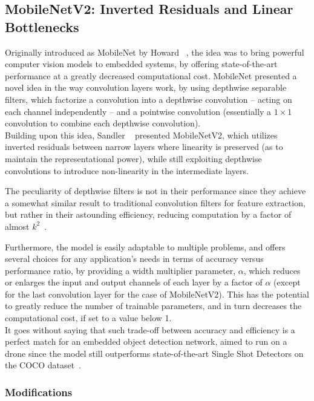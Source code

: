 \subsection{MobileNetV2: Inverted Residuals and Linear Bottlenecks}

Originally introduced as MobileNet by Howard \etal~\cite{MobileNet}, the idea
was to bring powerful computer vision models to embedded systems, by offering
state-of-the-art performance at a greatly decreased computational cost.
MobileNet presented a novel idea in the way convolution layers work, by using
depthwise separable filters, which factorize a convolution into a depthwise
convolution -- acting on each channel independently -- and a pointwise
convolution (essentially a $1\times1$ convolution to combine each depthwise
convolution).\\

Building upon this idea, Sandler \etal~\cite{MobileNetV2} presented
MobileNetV2, which utilizes inverted residuals between narrow layers where
linearity is preserved (as to maintain the representational power), while still
exploiting depthwise convolutions to introduce non-linearity in the
intermediate layers.

The peculiarity of depthwise filters is not in their performance since they
achieve a somewhat similar result to traditional convolution filters for
feature extraction, but rather in their astounding efficiency, reducing
computation by a factor of almost $k^2$~\cite{MobileNetV2}.

Furthermore, the model is easily adaptable to multiple problems, and offers
several choices for any application's needs in terms of accuracy versus
performance ratio, by providing a width multiplier parameter, $\alpha$, which
reduces or enlarges the input and output channels of each layer by a factor of
$\alpha$ (except for the last convolution layer for the case of MobileNetV2).
This has the potential to greatly reduce the number of trainable parameters,
and in turn decreases the computational cost, if set to a value below 1.\\

It goes without saying that such trade-off between accuracy and efficiency is a
perfect match for an embedded object detection network, aimed to run on a
drone since the model still outperforms state-of-the-art Single Shot Detectors
on the COCO dataset~\cite{MobileNetV2}.

\subsubsection{Modifications}

